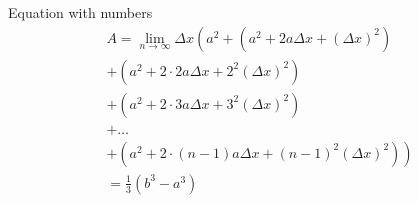 \documentclass{beamer}
\begin{document}
\begin{frame}
    \begin{exampleblock}{Equation with numbers}
        \begin{multline}
            A=\lim_{n\rightarrow\infty}\Delta x\left(a^{2}+\left(a^{2}+2a\Delta x+\left(\Delta x\right)^{2}\right)\right.\label{eq:reset}\\
            +\left(a^{2}+2\cdot2a\Delta x+2^{2}\left(\Delta x\right)^{2}\right)\\
            +\left(a^{2}+2\cdot3a\Delta x+3^{2}\left(\Delta x\right)^{2}\right)\\
            +\ldots\\
            \left.+\left(a^{2}+2\cdot(n-1)a\Delta x+(n-1)^{2}\left(\Delta x\right)^{2}\right)\right)\\
            =\frac{1}{3}\left(b^{3}-a^{3}\right)
        \end{multline}
    \end{exampleblock}
\end{frame}
\end{document}
